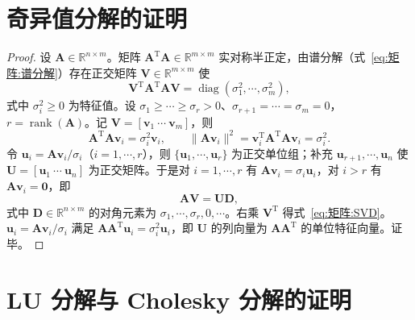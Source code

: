 \section{奇异值分解的证明}
\label{sec:SVD证明}

\begin{proof}
设 $\boldsymbol{A}\in\mathbb{R}^{n\times m}$。矩阵 $\boldsymbol{A}^{\mathrm{T}}\boldsymbol{A}\in\mathbb{R}^{m\times m}$ 实对称半正定，由谱分解（式~\eqref{eq:矩阵:谱分解}）存在正交矩阵 $\boldsymbol{V}\in\mathbb{R}^{m\times m}$ 使
\[
\boldsymbol{V}^{\mathrm{T}}\boldsymbol{A}^{\mathrm{T}}\boldsymbol{A}\boldsymbol{V} = \operatorname{diag}(\sigma_1^{2},\cdots,\sigma_m^{2}),
\]
式中 $\sigma_i^{2}\geq 0$ 为特征值。设 $\sigma_1\geq\cdots\geq\sigma_r>0$、$\sigma_{r+1}=\cdots=\sigma_m=0$，$r = \operatorname{rank}(\boldsymbol{A})$。记 $\boldsymbol{V} = [\boldsymbol{v}_1\ \cdots\ \boldsymbol{v}_m]$，则
\[
\boldsymbol{A}^{\mathrm{T}}\boldsymbol{A}\boldsymbol{v}_i = \sigma_i^{2}\boldsymbol{v}_i,\qquad \|\boldsymbol{A}\boldsymbol{v}_i\|^{2} = \boldsymbol{v}_i^{\mathrm{T}}\boldsymbol{A}^{\mathrm{T}}\boldsymbol{A}\boldsymbol{v}_i = \sigma_i^{2}.
\]
令 $\boldsymbol{u}_i = \boldsymbol{A}\boldsymbol{v}_i/\sigma_i$（$i=1,\cdots,r$），则 $\{\boldsymbol{u}_1,\cdots,\boldsymbol{u}_r\}$ 为正交单位组；补充 $\boldsymbol{u}_{r+1},\cdots,\boldsymbol{u}_n$ 使 $\boldsymbol{U} = [\boldsymbol{u}_1\ \cdots\ \boldsymbol{u}_n]$ 为正交矩阵。于是对 $i=1,\cdots,r$ 有 $\boldsymbol{A}\boldsymbol{v}_i = \sigma_i\boldsymbol{u}_i$，对 $i>r$ 有 $\boldsymbol{A}\boldsymbol{v}_i = \boldsymbol{0}$，即
\[
\boldsymbol{A}\boldsymbol{V} = \boldsymbol{U}\boldsymbol{D},
\]
式中 $\boldsymbol{D}\in\mathbb{R}^{n\times m}$ 的对角元素为 $\sigma_1,\cdots,\sigma_r,0,\cdots$。右乘 $\boldsymbol{V}^{\mathrm{T}}$ 得式~\eqref{eq:矩阵:SVD}。$\boldsymbol{u}_i = \boldsymbol{A}\boldsymbol{v}_i/\sigma_i$ 满足 $\boldsymbol{A}\boldsymbol{A}^{\mathrm{T}}\boldsymbol{u}_i = \sigma_i^{2}\boldsymbol{u}_i$，即 $\boldsymbol{U}$ 的列向量为 $\boldsymbol{A}\boldsymbol{A}^{\mathrm{T}}$ 的单位特征向量。证毕。
\end{proof}

\section{LU 分解与 Cholesky 分解的证明}
\label{sec:LU证明}

